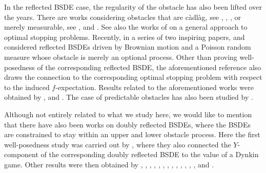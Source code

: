 \documentclass[10pt]{article} %
\begin{document}
\medskip
In the reflected BSDE case, the regularity of the obstacle has also been lifted over the years. There are works considering obstacles that are  c\`adl\`ag, see \citeauthor*{hamadene2002reflected} \cite{hamadene2002reflected}, \citeauthor*{lepeltier2005penalization} \cite{lepeltier2005penalization}, \citeauthor*{hamadene2003reflected} \cite{hamadene2003reflected}, or merely measurable, see \citeauthor*{peng2010reflected} \cite{peng2005smallest,peng2010reflected}, \citeauthor*{klimsiak2013bsdes} \cite{klimsiak2013bsdes,klimsiak2015reflected} and \citeauthor*{klimsiak2019reflected} \cite{klimsiak2019reflected}. See also the works of \citeauthor*{kobylanski2012optimal} \cite{kobylanski2012optimal} on a general approach to optimal stopping problems. Recently, in a series of two inspiring papers, \citeauthor*{grigorova2017reflected} \cite{grigorova2017reflected} and \citeauthor*{grigorova2020optimal} \cite{grigorova2020optimal} considered reflected BSDEs driven by Brownian motion and a Poisson random measure whose obstacle is merely an optional process. Other than proving well-posedness of the corresponding reflected BSDE, the aforementioned reference also draws the connection to the corresponding optimal stopping problem with respect to the induced $f$-expectation. Results related to the aforementioned works were obtained by \citeauthor{baadi2017reflected} \cite{baadi2017reflected,baadi2018reflected}, \citeauthor*{akdim2020strong} \cite{akdim2020strong} and \citeauthor*{bouhadou2022rbsdes} \cite{bouhadou2022rbsdes}. The case of predictable obstacles has also been studied by \citeauthor*{bouhadou2018non} \cite{bouhadou2018non,bouhadou2018optimal}.

\medskip
Although not entirely related to what we study here, we would like to mention that there have also been works on doubly reflected BSDEs, where the BSDEs are constrained to stay within an upper and lower obstacle process. Here the first well-posedness study was carried out by \citeauthor*{cvitanic1996backward} \cite{cvitanic1996backward}, where they also connected the $Y$-component of the corresponding doubly reflected BSDE to the value of a Dynkin game. Other results were then obtained by \citeauthor*{hamadene1997double} \cite{hamadene1997double}, \citeauthor*{lepeltier2004backward} \cite{lepeltier2004backward}, \citeauthor*{hamadene2005bsdes} \cite{hamadene2005bsdes,hamadene2006bsdes}, \citeauthor*{hamadene2006mixed} \cite{hamadene2006mixed}, \citeauthor*{crepey2008reflected} \cite{crepey2008reflected}, \citeauthor*{pham2013some} \cite{pham2013some}, \citeauthor*{essaky2013generalized} \cite{essaky2013generalized}, \citeauthor*{dumitrescu2016generalized} \cite{dumitrescu2016generalized}, \citeauthor*{grigorova2018doubly} \cite{grigorova2018doubly}, \citeauthor*{nie2022reflected} \cite{nie2022reflected}, \citeauthor*{klimsiak2013bsdes} \cite{klimsiak2013bsdes,klimsiak2015reflected,klimsiak2021non}, \citeauthor*{klimsiak2020reflected} \cite{klimsiak2020reflected}, \citeauthor*{klimsiak2021reflected} \cite{klimsiak2021reflected,klimsiak2022nonlinear}, \citeauthor*{arharas2021reflected} \cite{arharas2021reflected} and \citeauthor*{baadi2022reflected} \cite{baadi2022reflected}.
\end{document}
